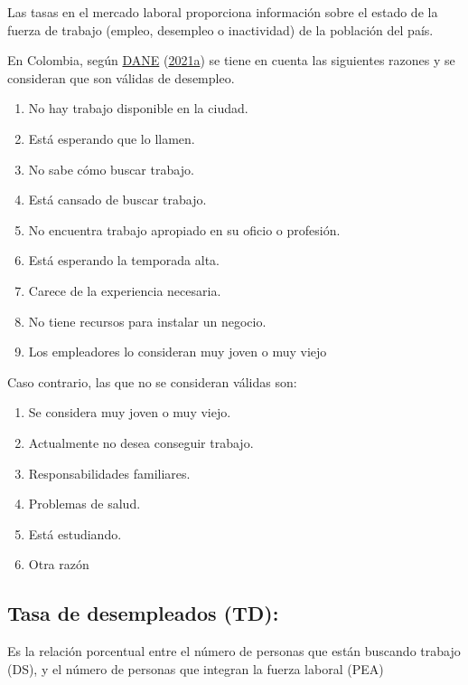 \documentclass[
  11pt,
]{book}
\providecommand{\tightlist}{%
  \setlength{\itemsep}{0pt}\setlength{\parskip}{0pt}}
\begin{document}
Las tasas en el mercado laboral proporciona información sobre el estado de la fuerza de trabajo (empleo, desempleo o inactividad) de la población del país.

En Colombia, según \protect\hyperlink{ref-DeCastroRamos2021Sep}{DANE} (\protect\hyperlink{ref-DeCastroRamos2021Sep}{2021a}) se tiene en cuenta las siguientes razones y se consideran que son válidas de desempleo.

\begin{enumerate}
\def\labelenumi{\alph{enumi}.}
\tightlist
\item
  No hay trabajo disponible en la ciudad.
\item
  Está esperando que lo llamen.
\item
  No sabe cómo buscar trabajo.
\item
  Está cansado de buscar trabajo.
\item
  No encuentra trabajo apropiado en su oficio o profesión.
\item
  Está esperando la temporada alta.
\item
  Carece de la experiencia necesaria.
\item
  No tiene recursos para instalar un negocio.
\item
  Los empleadores lo consideran muy joven o muy viejo
\end{enumerate}

Caso contrario, las que no se consideran válidas son:

\begin{enumerate}
\def\labelenumi{\alph{enumi}.}
\tightlist
\item
  Se considera muy joven o muy viejo.
\item
  Actualmente no desea conseguir trabajo.
\item
  Responsabilidades familiares.
\item
  Problemas de salud.
\item
  Está estudiando.
\item
  Otra razón
\end{enumerate}

\hypertarget{tasa-de-desempleados-td}{%
\subsection{Tasa de desempleados (TD):}\label{tasa-de-desempleados-td}}

Es la relación porcentual entre el número de personas que están
buscando trabajo (DS), y el número de personas que integran la fuerza laboral (PEA)
\end{document}
